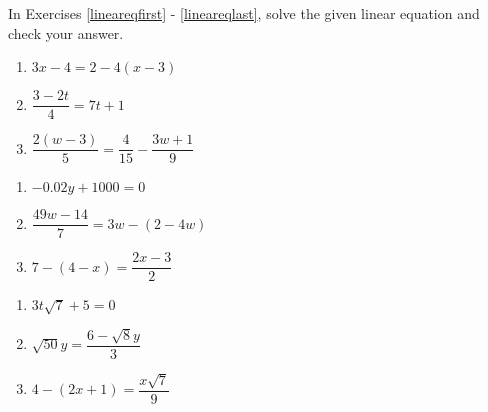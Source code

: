 \documentclass{ximera}
\begin{document}
	\author{Stitz-Zeager}


\label{ExercisesforAppLinearEqIneq}

In Exercises \ref{lineareqfirst} - \ref{lineareqlast}, solve the given linear equation and check your answer.  


\begin{multicols}{3}
\begin{enumerate}

\item $3x - 4 = 2 - 4(x-3)$\label{lineareqfirst} 
\item $\dfrac{3 - 2t}{4} = 7t+1$

\item  $\dfrac{2(w-3)}{5} = \dfrac{4}{15} - \dfrac{3w+1}{9}$ 

\setcounter{HW}{\value{enumi}}
\end{enumerate}
\end{multicols}

\begin{multicols}{3}
\begin{enumerate}
\setcounter{enumi}{\value{HW}}

\item  $-0.02y + 1000 = 0$  
\item  $\dfrac{49w - 14}{7}= 3w - (2-4w)$ 
\item  $7 - (4-x) = \dfrac{2x-3}{2}$  

\setcounter{HW}{\value{enumi}}
\end{enumerate}
\end{multicols}


\begin{multicols}{3}
\begin{enumerate}
\setcounter{enumi}{\value{HW}}

\item $3 t\sqrt{7}  + 5 = 0$  

\item  $\sqrt{50} y = \dfrac{6 - \sqrt{8} y}{3}$  

\item  $4 - (2x+1) = \dfrac{x \sqrt{7}}{9}$ \label{lineareqlast} 

\setcounter{HW}{\value{enumi}}
\end{enumerate}
\end{multicols}
\end{document}
